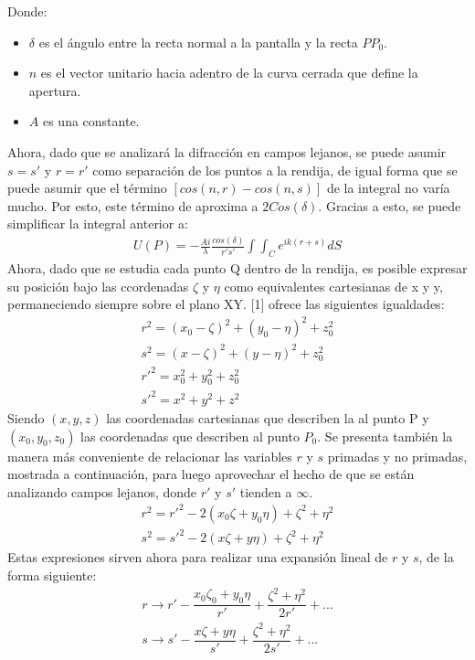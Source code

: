 \documentclass{article}
\begin{document}
Donde:
\begin{itemize}
\item $\delta$ es el ángulo entre la recta normal a la pantalla y la recta $PP_0$.
\item $n$ es el vector unitario hacia adentro de la curva cerrada que define la apertura.
\item $A$ es una constante.
\end{itemize}
Ahora, dado que se analizará la difracción en campos lejanos, se puede asumir $s=s\prime$ y $r=r\prime$ como separación de los puntos a la rendija, de igual forma que se puede asumir que el término $[cos(n,r)-cos(n,s)]$ de la integral no varía mucho. Por esto, este término de aproxima a $2Cos(\delta)$. Gracias a esto, se puede simplificar la integral anterior a:
\begin{eqnarray}
U(P)=-\frac{Ai}{\lambda}\frac{cos(\delta)}{r\prime s\prime} \int \int_{C} e^{ik(r+s)}dS
\end{eqnarray}
Ahora, dado que se estudia cada punto Q dentro de la rendija, es posible expresar su posición bajo las ccordenadas $\zeta$ y $\eta$ como equivalentes cartesianas de x y y, permaneciendo siempre sobre el plano XY. [1] ofrece las siguientes igualdades:
\begin{eqnarray}
r^2 = (x_0 - \zeta)^2 + (y_0 - \eta)^2 + z_0^2\\
s^2 = (x-\zeta)^2 + (y - \eta)^2 + z_0^2\\
r\prime ^2 = x_0^2 + y_0^2 + z_0^2\\
s\prime ^2 = x^2 + y^2 + z^2
\end{eqnarray}
Siendo $(x,y,z)$ las coordenadas cartesianas que describen la al punto P y $(x_0,y_0,z_0)$ las coordenadas que describen al punto $P_0$. Se presenta también la manera más conveniente de relacionar las variables $r$ y $s$ primadas y no primadas, mostrada a continuación, para luego aprovechar el hecho de que se están analizando campos lejanos, donde $r\prime$ y $s\prime$ tienden a $\infty$.
\begin{eqnarray}
r^2 = r\prime ^2 - 2(x_0\zeta + y_0\eta) + \zeta^2 + \eta^2\\
s^2 = s\prime ^2 - 2(x\zeta + y\eta) + \zeta^2 + \eta^2
\end{eqnarray}
Estas expresiones sirven ahora para realizar una expansión lineal de $r$ y $s$, de la forma siguiente:
\begin{eqnarray}
r \rightarrow r\prime - \dfrac{x_0\zeta_0 + y_0\eta}{r\prime} + \dfrac{\zeta^2 + \eta^2}{2r\prime}+...\\
s \rightarrow s\prime - \dfrac{x\zeta + y\eta}{s\prime} +\dfrac{\zeta^2 + \eta^2}{2s\prime} + ...
\end{eqnarray}
\end{document}
